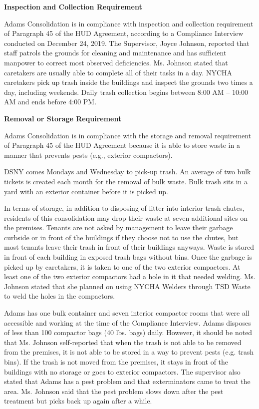 

\textbf{Inspection and Collection Requirement}

Adams Consolidation is in compliance with inspection and collection requirement of Paragraph 45 of the HUD Agreement, according to a Compliance Interview conducted on December 24, 2019. The Supervisor, Joyce Johnson, reported that staff patrols the grounds for cleaning and maintenance and has sufficient manpower to correct most observed deficiencies. Ms. Johnson stated that caretakers are usually able to complete all of their tasks in a day. NYCHA caretakers pick up trash inside the buildings and inspect the grounds two times a day, including weekends. Daily trash collection begins between 8:00 AM -- 10:00 AM and ends before 4:00 PM. 

\textbf{Removal or Storage Requirement}

Adams Consolidation is in compliance with the storage and removal requirement of Paragraph 45 of the HUD Agreement because it is able to store waste in a manner that prevents pests (e.g., exterior compactors).

DSNY comes Mondays and Wednesday to pick-up trash. An average of two bulk tickets is created each month for the removal of bulk waste. Bulk trash sits in a yard with an exterior container before it is picked up. 

In terms of storage, in addition to disposing of litter into interior trash chutes, residents of this consolidation may drop their waste at seven additional sites on the premises. Tenants are not asked by management to leave their garbage curbside or in front of the buildings if they choose not to use the chutes, but most tenants leave their trash in front of their buildings anyways. Waste is stored in front of each building in exposed trash bags without bins. Once the garbage is picked up by caretakers, it is taken to one of the two exterior compactors. At least one of the two exterior compactors had a hole in it that needed welding. Ms. Johnson stated that she planned on using NYCHA Welders through TSD Waste to weld the holes in the compactors.

Adams has one bulk container and seven interior compactor rooms that were all accessible and working at the time of the Compliance Interview. Adams disposes of less than 100 compactor bags (40 lbs. bags) daily. However, it should be noted that Ms. Johnson self-reported that when the trash is not able to be removed from the premises, it is not able to be stored in a way to prevent pests (e.g. trash bins). If the trash is not moved from the premises, it stays in front of the buildings with no storage or goes to exterior compactors. The supervisor also stated that Adams has a pest problem and that exterminators came to treat the area. Ms. Johnson said that the pest problem slows down after the pest treatment but picks back up again after a while.

